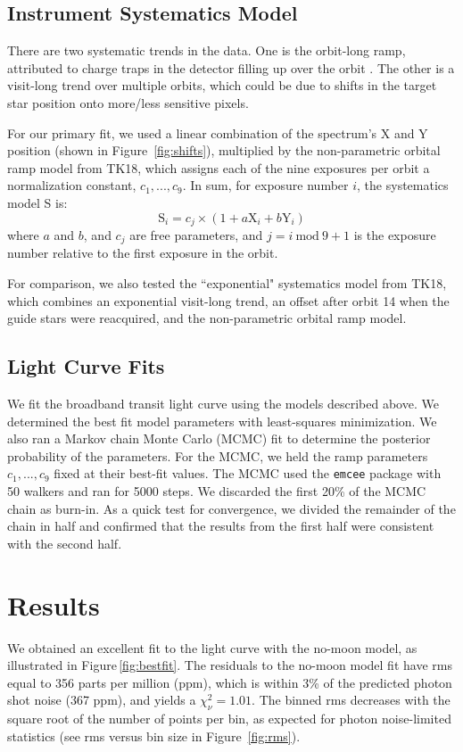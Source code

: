 \documentclass[twocolumn]{aastex62}
\newcommand{\Mod}[1]{\ \mathrm{mod}\ #1}
\begin{document}
\subsection{Instrument Systematics Model}
\label{sec:sys}
There are two systematic trends in the data. One is the orbit-long ramp, attributed to charge traps in the detector filling up over the orbit \citep{zhou17}. The other is a visit-long trend over multiple orbits, which could be due to shifts in the target star position onto more/less sensitive pixels.

For our primary fit, we used a linear combination of the spectrum's X and Y position (shown in Figure~\ref{fig:shifts}), multiplied by the non-parametric orbital ramp model from TK18, which assigns each of the nine exposures per orbit a normalization constant, $c_1, ..., c_9$. In sum, for exposure number $i$, the systematics model S is:
\begin{equation}
\label{eq:sys}
    \mathrm{S}_i = c_{j}\times(1 + a\mathrm{X}_i + b\mathrm{Y}_i) 
\end{equation}
where $a$ and $b$, and $c_j$ are free parameters, and $j = i\Mod9 + 1$ is the exposure number relative to the first exposure in the orbit. 

For comparison, we also tested the ``exponential" systematics model from TK18, which combines an exponential visit-long trend, an offset after orbit 14 when the guide stars were reacquired, and the non-parametric orbital ramp model.


\subsection{Light Curve Fits}
We fit the broadband transit light curve using the models described above.  We determined the best fit model parameters with least-squares minimization.  We also ran a Markov chain Monte Carlo (MCMC) fit to determine the posterior probability of the parameters. For the MCMC, we held the ramp parameters $c_1, ..., c_9$ fixed at their best-fit values.  The MCMC used the \texttt{emcee} package \citep{foremanmackey13} with 50 walkers and ran for 5000 steps. We discarded the first 20\% of the MCMC chain as burn-in. As a quick test for convergence, we divided the remainder of the chain in half and confirmed that the results from the first half were consistent with the second half.


\section{Results}
We obtained an excellent fit to the light curve with the no-moon model, as illustrated in  Figure\,\ref{fig:bestfit}. The residuals to the no-moon model fit have rms equal to 356 parts per million (ppm), which is within 3\% of the predicted photon shot noise (367 ppm), and yields a $\chi_\nu^2 = 1.01$. The binned rms decreases with the square root of the number of points per bin, as expected for photon noise-limited statistics (see rms versus bin size in Figure~\ref{fig:rms}).
\end{document}
